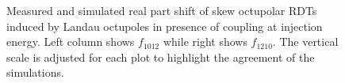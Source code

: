 \begin{figure}[!htb]
\begin{subfigure}{0.47\textwidth}
    \end{subfigure}
    \caption{Measured and simulated real part shift of skew octupolar RDTs induced by Landau
    octupoles in presence of coupling at injection energy. Left column shows $f_{1012}$ while right
    shows $f_{1210}$. The vertical scale is adjusted for each plot to highlight the agreement of the 
    simulations.}
    \label{fig:skew_octupolar:response_meas_sim_coupling}
\end{figure}


